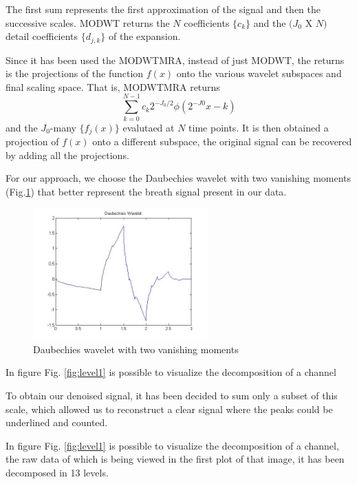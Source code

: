 The first sum represents the first approximation of the signal and then the successive scales.
MODWT returns the $N$ coefficients $\{c_k\}$ and the $(J_0 $ X $ N)$ detail coefficients $\{d_{j,k}\}$ of the expansion. 

Since it has been used the MODWTMRA, instead of just MODWT, the returns is the projections of the function $f(x)$ onto the various wavelet subspaces and final scaling space. That is, MODWTMRA returns 
$$\sum_{k=0}^{N-1} c_k 2^{-J_0/2} \phi(2^{-J0}x-k)$$\newline
and the $J_0$-many $\{f_j(x)\}$ evalutaed at $N$ time points.
It is then obtained a projection of $f(x)$ onto a different subspace, the original signal can be recovered by adding all the projections. 

For our approach, we choose the Daubechies wavelet with two vanishing moments (Fig.\ref{fig:Daubechies}) that better represent the breath signal present in our data.

\begin{figure}[h]
    \centering
    \includegraphics[width=0.6\textwidth]{img/gooddb.jpeg}
    \caption{Daubechies wavelet with two vanishing moments}
    \label{fig:Daubechies}
\end{figure}

In figure Fig. \ref{fig:level1} is possible to visualize the decomposition of a channel

To obtain our denoised signal, it has been decided to sum only a subset of this scale, which allowed us to reconstruct a clear signal where the peaks could be underlined and counted. 

In figure Fig. \ref{fig:level1} is possible to visualize the decomposition of a channel, the raw data of which is being viewed in the first plot of that image, it has been decomposed in 13 levels. \\



